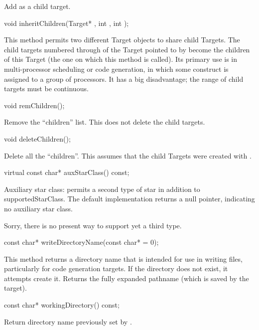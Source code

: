Add  as a child target.

\begin{example}
void inheritChildren(Target* , int , int );
\end{example}

This method permits two different Target objects to share child Targets.
The child targets numbered  through  of the Target
pointed to by  become the children of this Target (the one
on which this method is called).  Its primary use is in multi-processor
scheduling or code generation, in which some construct is assigned to
a group of processors.  It has a big disadvantage; the range of child
targets must be continuous.

\begin{example}
void remChildren();
\end{example}

Remove the ``children'' list.  This does not delete the child targets.

\begin{example}
void deleteChildren();
\end{example}

Delete all the ``children''.  This assumes that the child Targets
were created with .

\begin{example}
virtual const char* auxStarClass() const;
\end{example}

Auxiliary star class: permits a second type of star in addition
to supportedStarClass.  The default implementation returns a
null pointer, indicating no auxiliary star class.

Sorry, there is no present way to support yet a third type.

\begin{example}
const char* writeDirectoryName(const char*  = 0);
\end{example}

This method returns a directory name that is intended for
use in writing files, particularly for code generation targets.
If the directory does not exist, it attempts create it.
Returns the fully expanded pathname (which is saved by
the target).

\begin{example}
const char* workingDirectory() const;
\end{example}

Return directory name previously set by .

